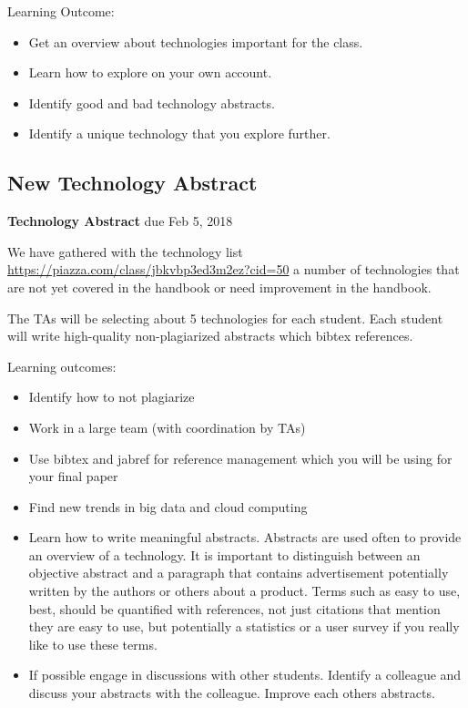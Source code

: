 Learning Outcome:

\begin{itemize}
\item Get an overview about technologies important for the class.
\item Learn how to explore on your own account.
\item Identify good and bad technology abstracts.
\item Identify a unique technology that you explore further.
\end{itemize}



\subsection{New Technology Abstract}
\label{E:616-new-tech-abstract}

\begin{exercise} {\bf Technology Abstract} due Feb 5, 2018

We have gathered with the technology list
\url{https://piazza.com/class/jbkvbp3ed3m2ez?cid=50} a number of
technologies that are not yet covered in the handbook or
need improvement in the handbook.


The TAs will be selecting about 5 technologies for each student. Each
student will write high-quality non-plagiarized abstracts which bibtex
references.
 

\end{exercise}

Learning outcomes:

\begin{itemize}

\item Identify how to not plagiarize
\item Work in a large team (with coordination by TAs)
\item Use bibtex and jabref for reference management which you will be
  using for your final paper
\item Find new trends in big data and cloud computing
\item Learn how to write meaningful abstracts. Abstracts are used
  often to provide an overview of a technology. It is important to
  distinguish between an objective abstract and a paragraph that
  contains advertisement potentially written by the authors or others
  about a product. Terms such as easy to use, best, should be
  quantified with references, not just citations that mention they are
  easy to use, but potentially a statistics or a user survey if you
  really like to use these terms. 
\item If possible engage in discussions with other students. Identify
  a colleague and discuss your abstracts with the colleague. Improve
  each others abstracts.
\end{itemize}

